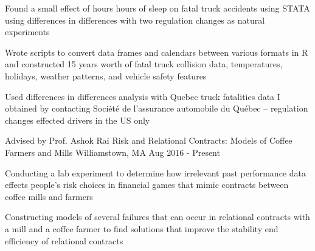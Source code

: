 \begin{cventries}
{\begin{cvitems}
        \item {Found a small effect of hours hours of sleep on fatal truck accidents using STATA using differences in differences with two regulation changes as natural experiments}
        \item{Wrote scripts to convert data frames and calendars between various formats in R and constructed 15 years worth of fatal truck collision data, temperatures, holidays, weather patterns, and vehicle safety features}
        \item {Used differences in differences analysis with Quebec truck fatalities data I obtained by contacting Société de l'assurance automobile du Québec -- regulation changes effected drivers in the US only}
      \end{cvitems}
    }
  \cventry
    {Advised by Prof. Ashok Rai}
    {Risk and Relational Contracts: Models of Coffee Farmers and Mills}
    {Williamstown, MA}
    {Aug 2016 - Present}
    {
      \begin{cvitems}
        \item {Conducting a lab experiment to determine how irrelevant past performance data effects people's risk choices in financial games that mimic contracts between coffee mills and farmers}
        \item {Constructing models of several failures that can occur in relational contracts with a mill and a coffee farmer to find solutions that improve the stability end efficiency of relational contracts}
      \end{cvitems}
     }
\end{cventries}
